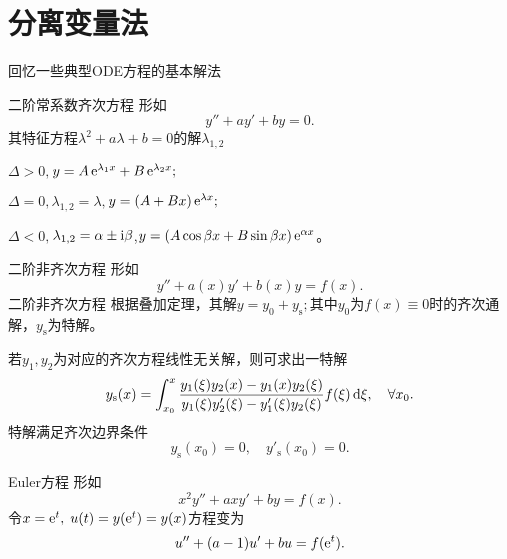 \chapter{分离变量法}
回忆一些典型ODE方程的基本解法
\begin{method}{二阶常系数齐次方程}{}
	形如
	\begin{equation}
		y''+ay'+by=0.
	\end{equation}
	其特征方程$\lambda^2+a\lambda+b=0$的解$\lambda_{1,2}$
	\begin{compactenum}[I.]
		\item $\Delta>0,$\quad$y=A\mathop{}\!\mathrm{e}^{\lambda_1x}+B\mathop{}\!\mathrm{e}^{\lambda_2x};$
		\item $\Delta=0,$\quad$\lambda_{1,2}=\lambda,$\quad$y=(A+Bx)\mathop{}\!\mathrm{e}^{\lambda x};$
		\item $\Delta<0,$\quad$\lambda_{1,2}=\alpha\pm\mathrm{i}\beta$,\quad$y=(A\cos\beta x+B\sin\beta x)\mathop{}\!\mathrm{e}^{\alpha x}$。
	\end{compactenum}
\end{method}
\begin{method}{二阶非齐次方程}{}
	形如
	\begin{equation}
		y''+a(x)y'+b(x)y=f(x).
	\end{equation}
	二阶非齐次方程
	根据叠加定理，其解$y=y_0+y_\mathrm s;$其中$y_0$为$f(x)\equiv 0$时的齐次通解，$y_\mathrm s$为特解。
	
	若$y_1,y_2$为对应的齐次方程线性无关解，则可求出一特解
	\begin{align}\label{General to Particular Solution}
		y_\mathrm s(x)=\int_{x_0}^x\frac{y_1(\xi)y_2(x)-y_1(x)y_2(\xi)}{y_1(\xi)y_2'(\xi)-y_1'(\xi)y_2(\xi)}f(\xi)\mathop{}\!\mathrm{d} \xi,\quad\forall x_0.
	\end{align}
	特解满足齐次边界条件
	\[
		y_\mathrm s(x_0)=0,\quad y'_\mathrm s(x_0)=0.
	\]
\end{method}
\begin{method}{Euler方程}{}
	形如
	\begin{equation}
		x^2y''+axy'+by=f(x).
	\end{equation}
	令$x=\mathop{}\!\mathrm{e}^ t,\;u(t)=y(\mathop{}\!\mathrm{e}^ t)=y(x)$方程变为
	\begin{align}
		u''+(a-1)u'+bu=f(\mathop{}\!\mathrm{e}^ t).
	\end{align}
\end{method}

